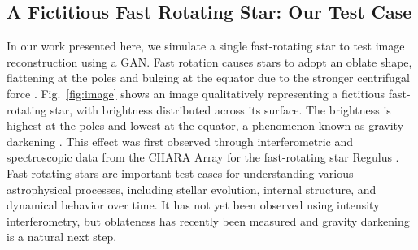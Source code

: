 \subsection{A Fictitious Fast Rotating Star: Our Test Case}
In our work presented here, we simulate a single fast-rotating star to test image reconstruction using a GAN. Fast rotation causes stars to adopt an oblate shape, flattening at the poles and bulging at the equator due to the stronger centrifugal force \citep[e.g.,][]{von1924radiative, 1999A&A...347..185M}. Fig.~\ref{fig:image} shows an image qualitatively representing a fictitious fast-rotating star, with brightness distributed across its surface. The brightness is highest at the poles and lowest at the equator, a phenomenon known as gravity darkening \citep{lucy1967gravity}. This effect was first observed through interferometric and spectroscopic data from the CHARA Array for the fast-rotating star Regulus \cite{mcalister2005first}. Fast-rotating stars are important test cases for understanding various astrophysical processes, including stellar evolution, internal structure, and dynamical behavior over time.  It has not yet been observed using intensity interferometry, but oblateness has recently been measured \citep{2025arXiv250615027A} and gravity darkening is a natural next step.

